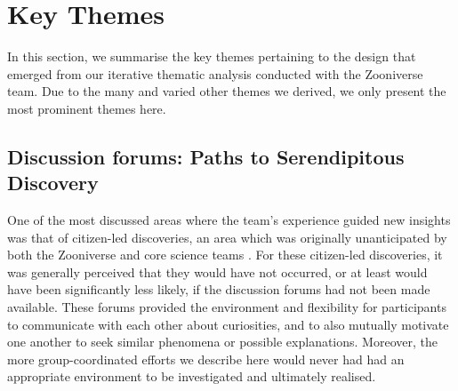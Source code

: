 \documentclass{sigchi}
\begin{document}



\section{Key Themes}

In this section, we summarise the key themes pertaining to the design that emerged from our iterative thematic analysis conducted with the Zooniverse team.  Due to the many and varied other themes we derived, we only present the most prominent themes here.

\subsection{Discussion forums: Paths to Serendipitous Discovery}

One of the most discussed areas where the team's experience guided new insights was that of citizen-led discoveries, an area which was originally unanticipated by both the Zooniverse and core science teams .  For these citizen-led discoveries, it was generally perceived that they would have not occurred, or at least would have been significantly less likely, if the discussion forums had not been made available.  These forums provided the environment and flexibility for participants to communicate with each other about curiosities, and to also mutually motivate one another to seek similar phenomena or possible explanations. Moreover, the more group-coordinated efforts we describe here would never had had an appropriate environment to be investigated and ultimately realised. 
\end{document}
